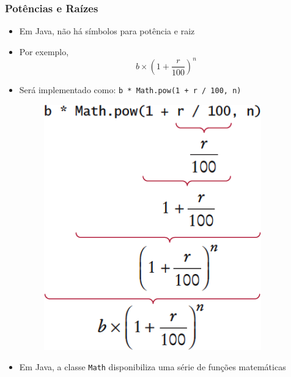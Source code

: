 \documentclass[xcolor={dvipsnames,table},aspectratio=169]{beamer}
\begin{document}
\begin{frame}\frametitle{Potências e Raízes}
\begin{itemize}
	\item Em Java, não há símbolos para potência e raiz
	\item Por exemplo, \[b \times \left(1+\frac{r}{100}\right)^n\]
	\item Será implementado como: \texttt{b * Math.pow(1 + r / 100, n)}
\begin{figure}[h]
	\includegraphics[height=0.3\paperheight,center]{pucrs-ep-fprog-unidade_02-tipos_de_dados_fundamentais-laminas-pow.png}
\end{figure}
	\item Em Java, a classe \texttt{Math} disponibiliza uma série de funções matemáticas
\end{itemize}
\end{frame}
\end{document}
